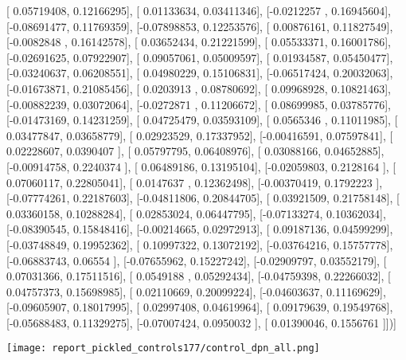 \documentclass{article}
\begin{document}
       [ 0.05719408,  0.12166295],
       [ 0.01133634,  0.03411346],
       [-0.0212257 ,  0.16945604],
       [-0.08691477,  0.11769359],
       [-0.07898853,  0.12253576],
       [ 0.00876161,  0.11827549],
       [-0.0082848 ,  0.16142578],
       [ 0.03652434,  0.21221599],
       [ 0.05533371,  0.16001786],
       [-0.02691625,  0.07922907],
       [ 0.09057061,  0.05009597],
       [ 0.01934587,  0.05450477],
       [-0.03240637,  0.06208551],
       [ 0.04980229,  0.15106831],
       [-0.06517424,  0.20032063],
       [-0.01673871,  0.21085456],
       [ 0.0203913 ,  0.08780692],
       [ 0.09968928,  0.10821463],
       [-0.00882239,  0.03072064],
       [-0.0272871 ,  0.11206672],
       [ 0.08699985,  0.03785776],
       [-0.01473169,  0.14231259],
       [ 0.04725479,  0.03593109],
       [ 0.0565346 ,  0.11011985],
       [ 0.03477847,  0.03658779],
       [ 0.02923529,  0.17337952],
       [-0.00416591,  0.07597841],
       [ 0.02228607,  0.0390407 ],
       [ 0.05797795,  0.06408976],
       [ 0.03088166,  0.04652885],
       [-0.00914758,  0.2240374 ],
       [ 0.06489186,  0.13195104],
       [-0.02059803,  0.2128164 ],
       [ 0.07060117,  0.22805041],
       [ 0.0147637 ,  0.12362498],
       [-0.00370419,  0.1792223 ],
       [-0.07774261,  0.22187603],
       [-0.04811806,  0.20844705],
       [ 0.03921509,  0.21758148],
       [ 0.03360158,  0.10288284],
       [ 0.02853024,  0.06447795],
       [-0.07133274,  0.10362034],
       [-0.08390545,  0.15848416],
       [-0.00214665,  0.02972913],
       [ 0.09187136,  0.04599299],
       [-0.03748849,  0.19952362],
       [ 0.10997322,  0.13072192],
       [-0.03764216,  0.15757778],
       [-0.06883743,  0.06554   ],
       [-0.07655962,  0.15227242],
       [-0.02909797,  0.03552179],
       [ 0.07031366,  0.17511516],
       [ 0.0549188 ,  0.05292434],
       [-0.04759398,  0.22266032],
       [ 0.04757373,  0.15698985],
       [ 0.02110669,  0.20099224],
       [-0.04603637,  0.11169629],
       [-0.09605907,  0.18017995],
       [ 0.02997408,  0.04619964],
       [ 0.09179639,  0.19549768],
       [-0.05688483,  0.11329275],
       [-0.07007424,  0.0950032 ],
       [ 0.01390046,  0.1556761 ]])]
\begin{center}
\texttt{[image: report\_pickled\_controls177/control\_dpn\_all.png]}

\end{center}
\end{document}
